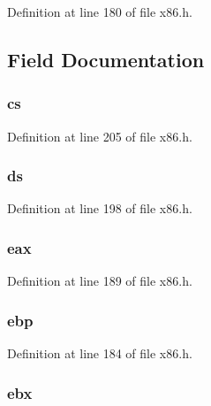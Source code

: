 Definition at line 180 of file x86.\-h.



\subsection{Field Documentation}
\hypertarget{structtrapframe_a2c1a506f83f7be334e4128748f4a2eaa}{
\subsubsection[{cs}]{ cs}}\label{structtrapframe_a2c1a506f83f7be334e4128748f4a2eaa}


Definition at line 205 of file x86.\-h.

\hypertarget{structtrapframe_a0d354e57548a3fa1b2f8ab075a9bcb7e}{
\subsubsection[{ds}]{ ds}}\label{structtrapframe_a0d354e57548a3fa1b2f8ab075a9bcb7e}


Definition at line 198 of file x86.\-h.

\hypertarget{structtrapframe_a6f7100b52071edc47e593b1c6a9453cb}{
\subsubsection[{eax}]{ eax}}\label{structtrapframe_a6f7100b52071edc47e593b1c6a9453cb}


Definition at line 189 of file x86.\-h.

\hypertarget{structtrapframe_a8d9d61f0e845561448cf50ddf637e6b3}{
\subsubsection[{ebp}]{ ebp}}\label{structtrapframe_a8d9d61f0e845561448cf50ddf637e6b3}


Definition at line 184 of file x86.\-h.

\hypertarget{structtrapframe_a685d686dce7abed5d536f3304c4692b9}{
\subsubsection[{ebx}]{ ebx}}\label{structtrapframe_a685d686dce7abed5d536f3304c4692b9}


